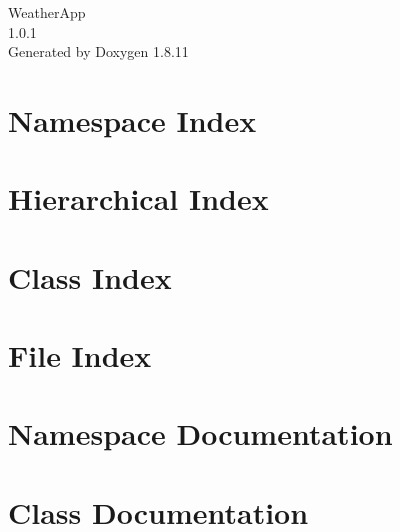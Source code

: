 \documentclass[twoside]{book}
\newcommand{\+}{\discretionary{\mbox{\scriptsize$\hookleftarrow$}}{}{}}
\newcommand{\clearemptydoublepage}{%
  \newpage{\pagestyle{empty}\cleardoublepage}%
}
\begin{document}
\hypersetup{pageanchor=false,
             bookmarksnumbered=true,
             pdfencoding=unicode
            }
\begin{titlepage}
\vspace*{7cm}
\begin{center}%
{\Large Weather\+App \\[1ex]\large 1.\+0.\+1 }\\
\vspace*{1cm}
{\large Generated by Doxygen 1.8.11}\\
\end{center}
\end{titlepage}
\clearemptydoublepage
\tableofcontents
\clearemptydoublepage
{}
\hypersetup{pageanchor=true}

\chapter{Namespace Index}

\chapter{Hierarchical Index}

\chapter{Class Index}

\chapter{File Index}

\chapter{Namespace Documentation}









\chapter{Class Documentation}











\end{document}
